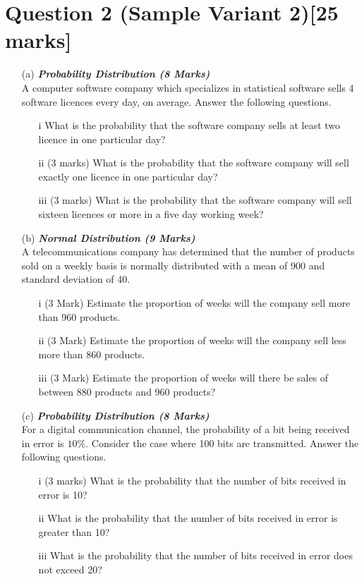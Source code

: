 \section*{Question 2 (Sample Variant 2)[25 marks]}
\begin{itemize}

\item[(a)] \textbf{\textit{Probability Distribution (8 Marks)}}\\ %
A computer software company which specializes in statistical software sells 4 software licences every day, on average. Answer the following questions.
    \begin{itemize}
    \item[i]  What is the probability that the software company sells at least two licence in one particular day?
    \item[ii] (3 marks) What is the probability that the software company will sell exactly one licence in one particular day?
    \item[iii] (3 marks) What is the probability that the software company will sell sixteen licences or more in a five day working week?
    \end{itemize}


\item[(b)] \textbf{\textit{Normal Distribution (9 Marks)}}\\ %
 A telecommunications company has determined that the number of products sold on a weekly basis is normally distributed with a mean of 900 and standard deviation of 40.
\begin{itemize}
\item[i] (3 Mark) Estimate the proportion of weeks will the company sell more than 960 products.

\item[ii] (3 Mark) Estimate the proportion of weeks will the company sell less more than 860 products.
\item[iii] (3 Mark) Estimate the proportion of weeks will there be sales of between 880
products and 960 products?
\end{itemize}

\item[(c)] \textbf{\textit{Probability Distribution (8 Marks)}}\\ %

For a digital communication channel, the probability of a bit being received in error is $10\%$. Consider the case where 100 bits are transmitted. Answer the following questions.

\begin{itemize}
\item[i] (3 marks)	What is the probability that the number of bits received in error is 10?
\item[ii]  What is the probability that the number of bits received in error is greater than 10?
\item[iii] 	What is the probability that the number of bits received in error does not exceed 20?
\end{itemize}

\end{itemize}
